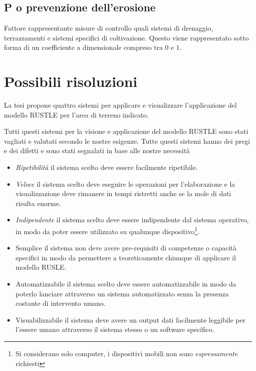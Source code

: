 \subsection{P o prevenzione dell'erosione}
Fattore rappresentante misure di controllo quali sistemi di drenaggio, terrazzamenti e sistemi specifici di coltivazione.
Questo viene rappresentato sotto forma di un coefficiente a dimensionale compreso tra $0$ e $1$.

\section{Possibili risoluzioni}
La tesi \cite{tesi:ambientale} propone quattro sistemi per applicare e visualizzare l'applicazione del modello RUSTLE per l'area di terreno indicato.

Tutti questi sistemi per la visione e applicazione del modello RUSTLE sono stati vagliati e valutati secondo le nostre esigenze. Tutte questi sistemi hanno dei pregi e dei difetti e sono stati segnalati in base alle nostre necessità

\begin{itemize}


	\item \textit{Ripetibilità} il sistema scelto deve essere facilmente ripetibile.

	\item \textit{Veloce} il sistema scelto deve eseguire le operazioni per l'elaborazione e la visualizzazione deve rimanere in tempi ristretti anche se la mole di dati risulta enorme.

	\item \textit{Indipendente} il sistema scelto deve essere indipendente dal sistema operativo, in modo da poter essere utilizzato su qualunque dispositivo\footnote{Si considerano solo computer, i dispositivi mobili non sono \textit{espressamente} richiesti}.

	\item{Semplice} il sistema non deve avere pre-requisiti di competenze o capacità specifici in modo da permettere a teoreticamente chiunque di applicare il modello RUSLE.

	\item{Automatizzabile} il sistema scelto deve essere automatizzabile in modo da poterlo lanciare attraverso un sistema automatizzato senza la presenza costante di intervento umano.

	\item{Visuabilizzabile} il sistema deve avere un output dati facilmente leggibile per l'essere umano attraverso il sistema stesso o un software specifico.

\end{itemize}

